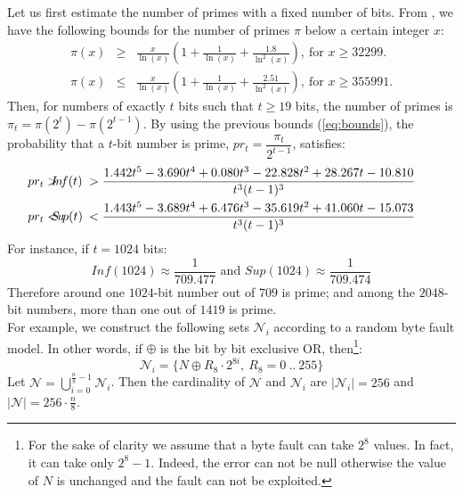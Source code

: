 \documentclass{article}
\begin{document}
Let us first estimate the number of primes with a fixed number of bits. From \cite[Theorem 1.10]{80}, we have the following bounds for the number of primes $\pi$ below a certain integer $x$:
\begin{eqnarray}
\label{eq:bounds}
\pi(x) & \geq & \frac{x}{\ln(x)} \left( 1 + \frac{1}{\ln(x)} +
  \frac{1.8}{\ln^2(x)} \right),~\mbox{for }x \geq 32299. \\ \nonumber
\pi(x) & \leq & \frac{x}{\ln(x)} \left( 1 + \frac{1}{\ln(x)} +
  \frac{2.51}{\ln^2(x)} \right),~\mbox{for }x \geq 355991.
\end{eqnarray}
Then, for numbers of exactly $t$ bits such that $t \geq 19$ bits, the
number of primes is $\pi_t = \pi(2^t)-\pi(2^{t-1})$. By using the
previous bounds (\ref{eq:bounds}), the probability that a $t$-bit
number is prime, $pr_t=\dfrac{\pi_t}{2^{t-1}}$, satisfies:
\begin{eqnarray}\small
 \label{eq:props}
\hspace{-15pt} pr_t > &\hspace{-5pt} {I\!n\!f}(t) &\hspace{-5pt} >  \frac{1.442t^5-3.690t^4+0.080t^3-22.828t^2+28.267t-10.810}{t^3(t-1)^3}\\  
 \nonumber
\hspace{-15pt} pr _t< &\hspace{-5pt} {S\!u\!p}(t) &\hspace{-5pt} < \frac{1.443t^5-3.689t^4+6.476t^3-35.619t^2+41.060t-15.073}{t^3(t-1)^3}
\end{eqnarray}
For instance, if $t = 1024$ bits:
$${I\!n\!f}(1024) \approx \frac{1}{709.477} \mbox{ and  }
{S\!u\!p}(1024) \approx \frac{1}{709.474}$$
Therefore around one $1024$-bit number out of $709$ is prime; and among the $2048$-bit numbers, more than one out of
$1419$ is prime.\\

For example, we construct the following sets ${\mathcal N_i}$ according to a random byte fault model.
In other words, if $\oplus$ is
the bit by bit exclusive OR, then\footnote[1]{For the sake of clarity
  we assume that a byte fault can take $2^8$ values. In fact, it can
  take only $2^8 - 1$. Indeed, the error can not be null otherwise the value of $N$ is unchanged and the fault can not be exploited.}:
\[ {\mathcal N_i}= \lbrace N \oplus R_{8} \cdot 2^{8i},~R_{8}=0~..~255
\rbrace 
\]
Let ${\mathcal N} = \bigcup_{i=0}^{\frac{n}{8}-1} {\mathcal N_i}$.
Then the cardinality of ${\mathcal N}$ and ${\mathcal N_i}$ are
$|{\mathcal N_i}|= 256$ and $|{\mathcal N}|= 256 \cdot \frac{n}{8}$. 
\end{document}
